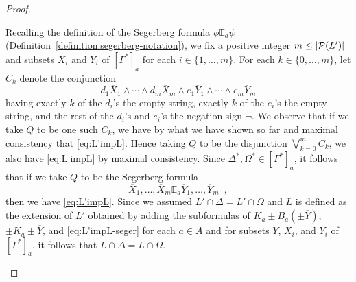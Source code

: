 \documentclass[12pt]{article}
\theoremstyle{definition}
\newcommand{\pow}{{\cal P}}    %
\begin{document}
\begin{proof}
\begin{itemize}
    Recalling the definition of the Segerberg formula
    $\overline\phi\mathbb{E}_a\overline\psi$
    (Definition~\ref{definition:segerberg-notation}), we fix a
    positive integer $m\leq|\pow(L')|$ and subsets $X_i$ and $Y_i$ of
    $[\Gamma^*]_a$ for each $i\in\{1,\dots,m\}$.  For each
    $k\in\{0,\dots,m\}$, let $C_k$ denote the conjunction
    \[
    d_1\overline X_1\land\cdots\land d_m\overline X_m
    \land
    e_1\overline Y_1\land\cdots\land e_m\overline Y_m
    \]
    having exactly $k$ of the $d_i$'s the empty string, exactly $k$ of
    the $e_i$'s the empty string, and the rest of the $d_i$'s and
    $e_i$'s the negation sign $\lnot$.  We observe that if we take $Q$
    to be one such $C_k$, we have by what we have shown so far and
    maximal consistency that \eqref{eq:L'impL}.  Hence taking $Q$ to
    be the disjunction $\bigvee_{k=0}^m C_k$, we also have
    \eqref{eq:L'impL} by maximal consistency.  Since
    $\Delta^*,\Omega^*\in[\Gamma^*]_a$, it follows that if we take $Q$
    to be the Segerberg formula
    \begin{equation}
      \overline X_1,\dots,\overline X_m\mathbb{E}_a\overline
      Y_1,\dots,\overline Y_m\enspace,
      \label{eq:L'impL-seger}
    \end{equation}
    then we have \eqref{eq:L'impL}.  Since we assumed
    $L'\cap\Delta=L'\cap\Omega$ and $L$ is defined as the extension of
    $L'$ obtained by adding the subformulas of $K_a{\pm}
    B_a({\pm}\overline Y)$, ${\pm}K_a{\pm}\overline Y$, and
    \eqref{eq:L'impL-seger} for each $a\in A$ and for subsets $Y$,
    $X_i$, and $Y_i$ of $[\Gamma^*]_a$, it follows that
    $L\cap\Delta=L\cap\Omega$.


\end{itemize}
\end{proof}
\end{document}
